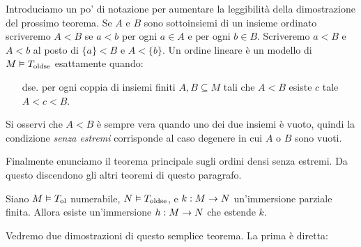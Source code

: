 Introduciamo un po' di notazione per aumentare la leggibilit\`a della dimostrazione del prossimo teorema. Se $A$ e $B$ sono sottoinsiemi di un insieme ordinato scriveremo $A<B$ se $a<b$ per ogni $a\in A$ e per ogni $b\in B$. Scriveremo $a<B$ e $A<b$ al posto di $\{a\}<B$ e $A<\{b\}$. Un ordine lineare \`e un modello di $M\models T_{\rm oldse}$ esattamente quando:

\begin{itemize}
\item[dse.] per ogni coppia di insiemi finiti $A, B\subseteq M$ tali che $A<B$ esiste $c$ tale  $A<c<B$.
\end{itemize} 

Si osservi che $A<B$ \`e sempre vera quando uno dei due insiemi \`e vuoto, quindi la condizione \textit{senza estremi\/} corrisponde al caso degenere in cui $A$ o $B$ sono vuoti.

Finalmente enunciamo il teorema principale sugli ordini densi senza estremi. Da questo discendono gli altri teoremi di questo paragrafo. 


\begin{lemma}\label{lem_ordinericco}
Siano $M\models T_{\rm ol}$ numerabile, $N\models T_{\rm oldse}$, e $k:M\imp N$ un'immersione parziale finita. Allora esiste un'immersione $h:M\imp N$ che estende $k$.
\end{lemma}

Vedremo due dimostrazioni di questo semplice teorema. La prima \`e diretta:

